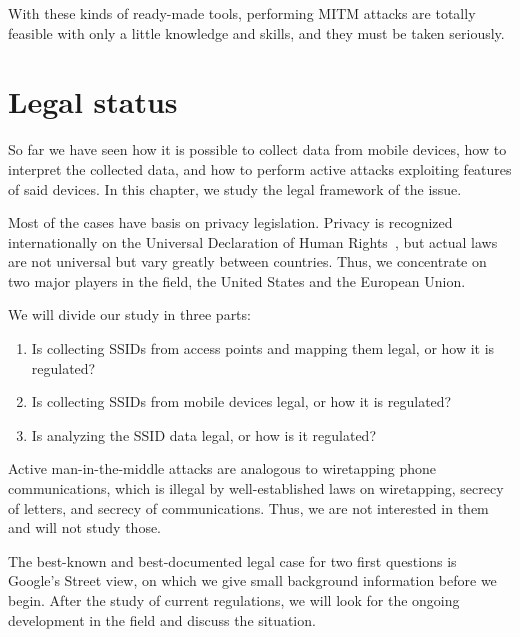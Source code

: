 \documentclass[12pt,a4paper,oneside,pdftex]{report}
\begin{document}
With these kinds of ready-made tools, performing MITM attacks are totally feasible with only a little knowledge and skills, and they must be taken seriously.



\chapter{Legal status}
\label{chapter:legal}

So far we have seen how it is possible to collect data from mobile devices, how to interpret the collected data, and how to perform active attacks exploiting features of said devices. In this chapter, we study the legal framework of the issue.

Most of the cases have basis on privacy legislation. Privacy is recognized internationally on the Universal Declaration of Human Rights~\cite{udhr}, but actual laws are not universal but vary greatly between countries. Thus, we concentrate on two major players in the field, the United States and the European Union.

We will divide our study in three parts:
\begin{enumerate}
    \item Is collecting SSIDs from access points and mapping them legal, or how it is regulated?
    \item Is collecting SSIDs from mobile devices legal, or how it is regulated?
    \item Is analyzing the SSID data legal, or how is it regulated?
\end{enumerate}

Active man-in-the-middle attacks are analogous to wiretapping phone communications, which is illegal by well-established laws on wiretapping, secrecy of letters, and secrecy of communications. Thus, we are not interested in them and will not study those.

The best-known and best-documented legal case for two first questions is Google's Street view, on which we give small background information before we begin. After the study of current regulations, we will look for the ongoing development in the field and discuss the situation.


\end{document}
